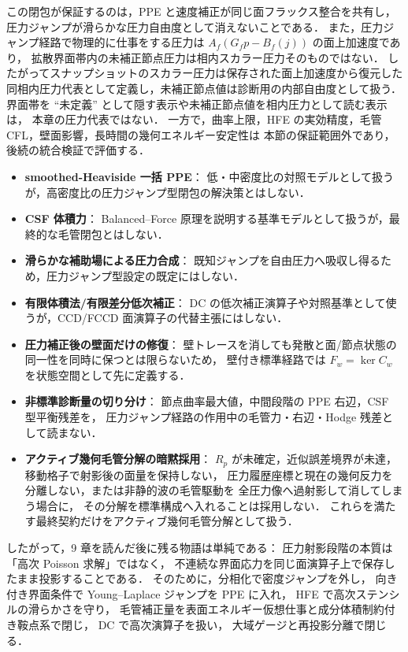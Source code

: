 この閉包が保証するのは，PPE と速度補正が同じ面フラックス整合を共有し，
圧力ジャンプが滑らかな圧力自由度として消えないことである．
また，圧力ジャンプ経路で物理的に仕事をする圧力は
$A_f(G_fp-B_f(j))$ の面上加速度であり，
拡散界面帯内の未補正節点圧力は相内スカラー圧力そのものではない．
したがってスナップショットのスカラー圧力は保存された面上加速度から復元した
同相内圧力代表として定義し，未補正節点値は診断用の内部自由度として扱う．
界面帯を ``未定義'' として隠す表示や未補正節点値を相内圧力として読む表示は，
本章の圧力代表ではない．
一方で，曲率上限，HFE の実効精度，毛管 CFL，壁面影響，長時間の幾何エネルギー安定性は
本節の保証範囲外であり，後続の統合検証で評価する．

\begin{tcolorbox}[warnbox, title={§9 が主張しないもの}]
\begin{itemize}[noitemsep]
  \item \textbf{smoothed-Heaviside 一括 PPE}：
        低・中密度比の対照モデルとして扱うが，高密度比の圧力ジャンプ型閉包の解決策とはしない．
  \item \textbf{CSF 体積力}：
        Balanced--Force 原理を説明する基準モデルとして扱うが，最終的な毛管閉包とはしない．
  \item \textbf{滑らかな補助場による圧力合成}：
        既知ジャンプを自由圧力へ吸収し得るため，圧力ジャンプ型設定の既定にはしない．
  \item \textbf{有限体積法/有限差分低次補正}：
        DC の低次補正演算子や対照基準として使うが，CCD/FCCD 面演算子の代替主張にはしない．
  \item \textbf{圧力補正後の壁面だけの修復}：
        壁トレースを消しても発散と面/節点状態の同一性を同時に保つとは限らないため，
        壁付き標準経路では $F_w=\ker C_w$ を状態空間として先に定義する．
  \item \textbf{非標準診断量の切り分け}：
        節点曲率最大値，中間段階の PPE 右辺，CSF 型平衡残差を，
        圧力ジャンプ経路の作用中の毛管力・右辺・Hodge 残差として読まない．
  \item \textbf{アクティブ幾何毛管分解の暗黙採用}：
        $R_p$ が未確定，近似誤差境界が未達，移動格子で射影後の面量を保持しない，
        圧力履歴座標と現在の幾何反力を分離しない，または非静的波の毛管駆動を
        全圧力像へ過射影して消してしまう場合に，
        その分解を標準構成へ入れることは採用しない．
        これらを満たす最終契約だけをアクティブ幾何毛管分解として扱う．
\end{itemize}
\end{tcolorbox}

したがって，9 章を読んだ後に残る物語は単純である：
圧力射影段階の本質は「高次 Poisson 求解」ではなく，
不連続な界面応力を同じ面演算子上で保存したまま投影することである．
そのために，分相化で密度ジャンプを外し，
向き付き界面条件で Young--Laplace ジャンプを PPE に入れ，
HFE で高次ステンシルの滑らかさを守り，
毛管補正量を表面エネルギー仮想仕事と成分体積制約付き鞍点系で閉じ，
DC で高次演算子を扱い，
大域ゲージと再投影分離で閉じる．
